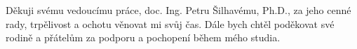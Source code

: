 \documentclass[a4paper,12pt]{article}
\begin{document}
\titulnistrana

\zadani

\prohlaseni

\abstraktaklicovaslova


\clearpage

\thispagestyle{empty}
Děkuji svému vedoucímu práce, doc. Ing. Petru Šilhavému, Ph.D., za jeho cenné rady, trpělivost a ochotu věnovat mi svůj čas. Dále bych chtěl poděkovat své rodině a přátelům za podporu a pochopení během mého studia.

\obsah  %


\OdsazovaniOdstavcuStart %














\OdsazovaniOdstavcuStop
\end{document}

